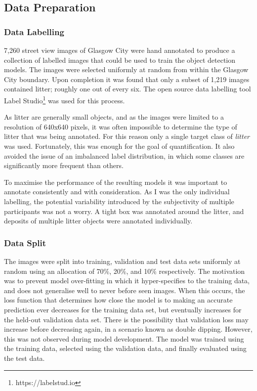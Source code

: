 \documentclass{thesis}
\begin{document}
\subsection{Data Preparation}

\subsubsection{Data Labelling}

7,260 street view images of Glasgow City were hand annotated to produce a collection of labelled images that could be used to train the object detection models. The images were selected uniformly at random from within the Glasgow City boundary. Upon completion it was found that only a subset of 1,219 images contained litter; roughly one out of every six. The open source data labelling tool Label Studio\footnote{https://labelstud.io} was used for this process.

As litter are generally small objects, and as the images were limited to a resolution of 640x640 pixels, it was often impossible to determine the type of litter that was being annotated. For this reason only a single target class of \textit{litter} was used. Fortunately, this was enough for the goal of quantification. It also avoided the issue of an imbalanced label distribution, in which some classes are significantly more frequent than others.

To maximise the performance of the resulting models it was important to annotate consistently and with consideration. As I was the only individual labelling, the potential variability introduced by the subjectivity of multiple participants was not a worry. A tight box was annotated around the litter, and deposits of multiple litter objects were annotated individually.

\subsubsection{Data Split}

The images were split into training, validation and test data sets uniformly at random using an allocation of 70\%, 20\%, and 10\% respectively. The motivation was to prevent model over-fitting in which it hyper-specifies to the training data, and does not generalise well to never before seen images. When this occurs, the loss function that determines how close the model is to making an accurate prediction ever decreases for the training data set, but eventually increases for the held-out validation data set. There is the possibility that validation loss may increase before decreasing again, in a scenario known as double dipping. However, this was not observed during model development. The model was trained using the training data, selected using the validation data, and finally evaluated using the test data.
\end{document}

